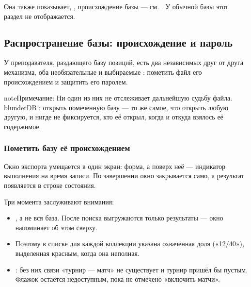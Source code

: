 \documentclass[letterpaper,10pt,russian]{sphinxmanual}
\begin{document}
\sphinxAtStartPar
Она также показывает, , происхождение базы — см. {\hyperref[\detokenize{manuel:diffusion-controlee}]{}}. У обычной базы этот раздел не отображается.


\subsection{Распространение базы: происхождение и пароль}
\label{\detokenize{manuel:diffuser-une-base-origine-et-mot-de-passe}}\label{\detokenize{manuel:diffusion-controlee}}
\sphinxAtStartPar
У преподавателя, раздающего базу позиций, есть два независимых друг от друга механизма, оба необязательные и выбираемые : пометить файл его происхождением и защитить его паролем.

\begin{sphinxadmonition}{note}{Примечание:}
\sphinxAtStartPar
Ни один из них не отслеживает дальнейшую судьбу файла. blunderDB : открыть помеченную базу — то же самое, что открыть любую другую, и нигде не фиксируется, кто её открыл, когда и откуда взялось её содержимое.
\end{sphinxadmonition}


\subsubsection{Пометить базу её происхождением}
\label{\detokenize{manuel:marquer-une-base-de-son-origine}}
\sphinxAtStartPar
Окно экспорта умещается в один экран: форма, а поверх неё — индикатор выполнения на время записи. По завершении окно закрывается само, а результат появляется в строке состояния.

\sphinxAtStartPar
Три момента заслуживают внимания:
\begin{itemize}
\item {} 
\sphinxAtStartPar
{}, а не вся база. После поиска выгружаются только результаты — окно напоминает об этом сверху.

\item {} 
\sphinxAtStartPar
{} Поэтому в списке для каждой коллекции указана охваченная доля («12/40»), выделенная красным, когда она неполная.

\item {} 
\sphinxAtStartPar
{}: без них связи «турнир — матч» не существует и турнир пришёл бы пустым. Флажок остаётся недоступным, пока не отмечено «включить матчи».

\end{itemize}
\end{document}
